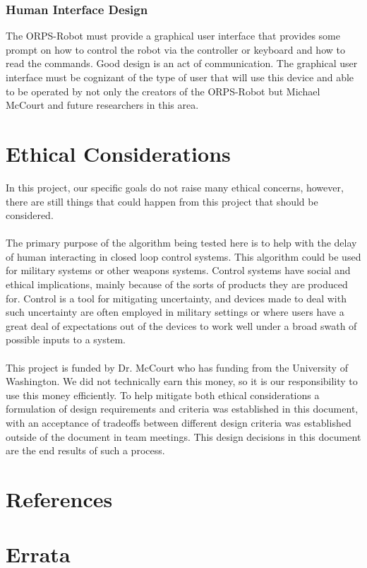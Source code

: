 \documentclass[english,12pt]{article}
\begin{document}
\subsubsection{Human Interface Design}
The ORPS-Robot must provide a graphical user interface
that provides some prompt on how to control the robot via
the controller or keyboard and how to read the commands. Good design is an act of communication.
The graphical user interface must be cognizant of the type of user that will use this device and able to be
operated by not only the creators of the ORPS-Robot but Michael McCourt and future researchers in this
area.
\section{Ethical Considerations}
In this project, our specific goals do not raise many ethical concerns, however, there are still things that
could happen from this project that should be considered.\\\\
The primary purpose of the algorithm being tested here is to help with the delay of
human interacting in closed loop control systems. This algorithm could be used for military systems or
other weapons systems. Control systems have social and ethical implications, mainly 
because of the sorts of products they are produced for. Control is a tool for mitigating 
uncertainty, and devices made to deal with such uncertainty are often employed in military settings 
or where users have a great deal of expectations out of the devices to work well under a broad swath 
of possible inputs to a system.\\\\
This project is funded by Dr. McCourt who has funding from the University of Washington. 
We did not technically earn this money, so it is our responsibility to use this money efficiently.
To help mitigate both ethical considerations a formulation of design requirements and criteria 
was established in this document, with an acceptance of tradeoffs between different design criteria 
was established outside of the document in team meetings. This design decisions in this document are 
the end results of such a process. 
\section{References}
\section{Errata}
\end{document}
